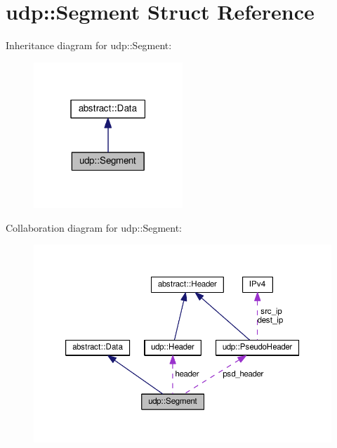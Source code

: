 \hypertarget{structudp_1_1Segment}{}\section{udp\+:\+:Segment Struct Reference}
\label{structudp_1_1Segment}


Inheritance diagram for udp\+:\+:Segment\+:
\nopagebreak
\begin{figure}[H]
\begin{center}
\leavevmode
\includegraphics[width=159pt]{structudp_1_1Segment__inherit__graph}
\end{center}
\end{figure}


Collaboration diagram for udp\+:\+:Segment\+:
\nopagebreak
\begin{figure}[H]
\begin{center}
\leavevmode
\includegraphics[width=350pt]{structudp_1_1Segment__coll__graph}
\end{center}
\end{figure}
